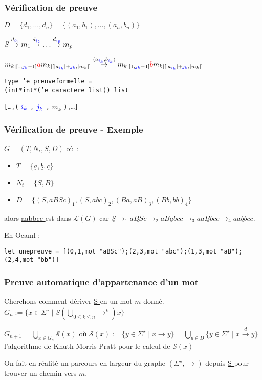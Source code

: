 \documentclass[12pt]{beamer}
\newcommand{\norm}[1]{\lvert #1 \rvert}
\begin{document}
\begin{frame}\frametitle{Vérification de preuve}
$D = \{d_1,\dots,d_n\} = \{(a_1,b_1),\dots,(a_n,b_n)\}$

$S \overset{d_{\color{blue} i_1}}{\rightarrow} m_1 \overset{d_{\color{blue} i_2}}{\rightarrow} \dots \overset{d_{\color{blue} i_p}}{\rightarrow} m_p$

${m_k}_{\mid [1,{\color{blue} j_k} - 1]} {\color{red} a } {m_k}_{\mid [\norm{a_{{\color{blue} i_k}}} + {\color{blue} j_k},\norm{m_k}]} \overset{(a_{{\color{blue} i_k}},b_{{\color{blue} i_k}})}{\rightarrow} {m_k}_{\mid [1,{\color{blue} j_k} - 1]} {\color{red} b } {m_k}_{\mid [\norm{a_{{\color{blue} i_k}}} + {\color{blue} j_k},\norm{m_k}]}$

{\small \color{DarkBlue}\texttt{type 'e preuveformelle = \\
(int*int*('e caractere list)) list}}

{\small \color{DarkBlue}\texttt{[\dots ,(}}
$\color{blue} i_k$
{\small \color{DarkBlue}\texttt{,}}
$\color{blue} j_k$
{\small \color{DarkBlue}\texttt{,}}
$m_k$
{\small \color{DarkBlue}\texttt{),\dots ]}}
\end{frame}
\begin{frame}\frametitle{Vérification de preuve - Exemple}
$G = (T,N_t,S,D)$ où :
\begin{itemize}
\item $T = \{\underline{ a },\underline{ b },\underline{ c }\}$
\item $N_t = \{\underline{ S },\underline{ B }\}$
\item $D = \{(\underline{ S },\underline{ aBSc })_1,(\underline{ S },\underline{ abc })_2,(\underline{ Ba },\underline{ aB })_3,(\underline{ Bb },\underline{ bb })_4\}$
\end{itemize}

alors \underline{ aabbcc } est dans $\mathcal{L}(G)$ car $\underline{ S } \rightarrow_1 \underline{ aBSc } \rightarrow_2 \underline{ aBabcc } \rightarrow_3 \underline{ aaBbcc } \rightarrow_4 \underline{ aabbcc }$.

En Ocaml :

{\small \color{DarkBlue}\texttt{let unepreuve = [(0,1,mot "aBSc");(2,3,mot "abc");(1,3,mot "aB");(2,4,mot "bb")]}}
\end{frame}

\begin{frame}\frametitle{Preuve automatique d'appartenance d'un mot}
Cherchons comment dériver \underline{ S } en un mot $m$ donné.
$G_n := \{x \in \Sigma^\star \mid S (\bigcup_{0 \leq k \leq n} \rightarrow^k) x\}$

$G_{n+1} = \bigcup_{x \in G_n} \mathcal{S}(x)$
où 
$\mathcal{S}(x) := \{y \in \Sigma^\star \mid x \rightarrow y \} = \bigcup_{d \in D} \{y \in \Sigma^\star \mid x \overset{d}{\rightarrow} y \}$
l'algorithme de Knuth-Morris-Pratt pour le calcul de $\mathcal{S}(x)$

On fait en réalité un parcours en largeur du graphe $(\Sigma^\star,\rightarrow)$ depuis \underline{ S } pour trouver un chemin vers $m$.
\end{frame}
\end{document}
